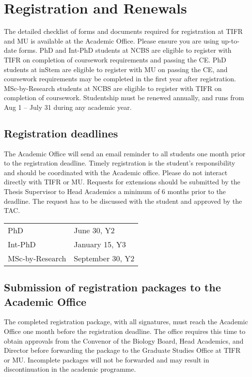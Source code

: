 \documentclass[a4paper,10pt]{article}
\begin{document}
\section{Registration and Renewals}

The detailed checklist of forms and documents required for registration at TIFR and MU is
available at the Academic Office. Please ensure you are using up-to-date forms. PhD and
Int-PhD students at NCBS are eligible to register with TIFR on completion of coursework
requirements and passing the CE. PhD students at inStem are eligible to register with MU on
passing the CE, and coursework requirements may be completed in the first year after
registration. MSc-by-Research students at NCBS are eligible to register with TIFR on
completion of coursework. Studentship must be renewed annually, and runs from Aug 1 –
July 31 during any academic year.

\subsection{Registration deadlines}
The Academic Office will send an email reminder to all students
one month prior to the registration deadline. Timely registration is the student’s
responsibility and should be coordinated with the Academic office. Please do not interact
directly with TIFR or MU. Requests for extensions should be submitted by the Thesis
Supervisor to Head Academics a minimum of 6 months prior to the deadline. The request
has to be discussed with the student and approved by the TAC.

\begin{tabular}{l l}
PhD & June 30, Y2 \\
Int-PhD & January 15, Y3 \\
MSc-by-Research & September 30, Y2 
\end{tabular} \newline

\subsection{Submission of registration packages to the Academic Office}
The completed registration
package, with all signatures, must reach the Academic Office one month before the
registration deadline. The office requires this time to obtain approvals from the Convenor of
the Biology Board, Head Academics, and Director before forwarding the package to the
Graduate Studies Office at TIFR or MU. Incomplete packages will not be forwarded and
may result in discontinuation in the academic programme.
\end{document}
